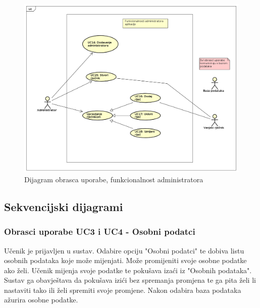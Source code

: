 					\begin{figure}[H]
						\includegraphics[width=\textwidth]{dijagrami/ucdiag2.png} %
						\caption{Dijagram obrasca uporabe, funkcionalnost administratora}
						\label{fig:ucdiag2} %
					\end{figure}

				\eject		
				
			\subsection{Sekvencijski dijagrami}
				
				\subsubsection{Obrasci uporabe UC3 i UC4 - Osobni podatci}
                    Učenik je prijavljen u sustav. Odabire opciju "Osobni podatci" te dobiva listu osobnih podataka koje može mijenjati.
                    Može promijeniti svoje osobne podatke ako želi. Učenik mijenja svoje podatke te pokušava izaći iz "Osobnih podataka".
                    Sustav ga obavještava da pokušava izići bez spremanja promjena te ga pita želi li nastaviti tako ili želi spremiti svoje promjene.
                    Nakon odabira baza podataka ažurira osobne podatke.

